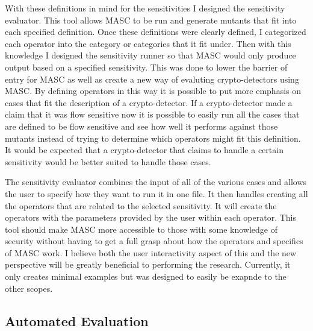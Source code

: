 With these definitions in mind for the sensitivities I designed the sensitivity evaluator. This tool allows MASC to be run and generate mutants that fit into each specified definition. Once these definitions were clearly defined, I categorized each operator into the category or categories that it fit under. Then with this knowledge I designed the sensitivity runner so that MASC would only produce output based on a specified sensitivity. This was done to lower the barrier of entry for MASC as well as create a new way of evaluting crypto-detectors using MASC. By defining operators in this way it is possible to put more emphasis on cases that fit the description of a crypto-detector. If a crypto-detector made a claim that it was flow sensitive now it is possible to easily run all the cases that are defined to be flow sensitive and see how well it performs against those mutants instead of trying to determine which operators might fit this definition. It would be expected that a crypto-detector that claims to handle a certain sensitivity would be better suited to handle those cases. 

The sensitivity evaluator combines the input of all of the various cases and allows the user to specify how they want to run it in one file. It then handles creating all the operators that are related to the selected sensitivity. It will create the operators with the parameters provided by the user within each operator. This tool should make MASC more accessible to those with some knowledge of security without having to get a full grasp about how the operators and specifics of MASC work. I believe both the user interactivity aspect of this and the new perspective will be greatly beneficial to performing the research. Currently, it only creates minimal examples but was designed to easily be exapnde to the other scopes.


\subsection{Automated Evaluation}
\label{ch3:subsec:automation}


